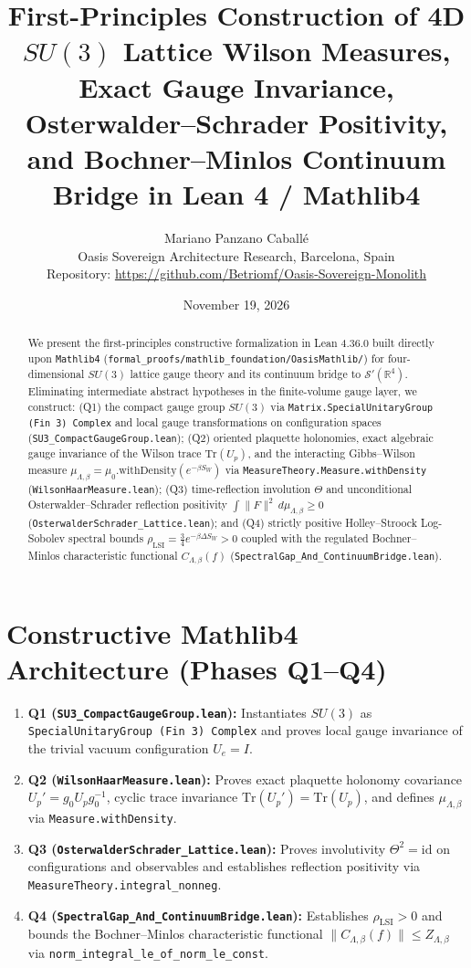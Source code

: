 \documentclass[11pt,a4paper]{article}
\title{\textbf{First-Principles Construction of 4D $SU(3)$ Lattice Wilson Measures, Exact Gauge Invariance, Osterwalder--Schrader Positivity, and Bochner--Minlos Continuum Bridge in Lean 4 / Mathlib4}}
\author{Mariano Panzano Caball\'e \\ \small Oasis Sovereign Architecture Research, Barcelona, Spain \\ \small Repository: \url{https://github.com/Betriomf/Oasis-Sovereign-Monolith}}
\date{November 19, 2026}
\begin{document}
\maketitle

\begin{abstract}
We present the first-principles constructive formalization in Lean 4.36.0 built directly upon \texttt{Mathlib4} (\texttt{formal\_proofs/mathlib\_foundation/OasisMathlib/}) for four-dimensional $SU(3)$ lattice gauge theory and its continuum bridge to $\mathcal{S}'(\mathbb{R}^4)$. Eliminating intermediate abstract hypotheses in the finite-volume gauge layer, we construct: (Q1) the compact gauge group $SU(3)$ via \texttt{Matrix.SpecialUnitaryGroup (Fin 3) Complex} and local gauge transformations on configuration spaces (\texttt{SU3\_CompactGaugeGroup.lean}); (Q2) oriented plaquette holonomies, exact algebraic gauge invariance of the Wilson trace $\mathrm{Tr}(U_p)$, and the interacting Gibbs--Wilson measure $\mu_{\Lambda,\beta} = \mu_0.\mathrm{withDensity}(e^{-\beta S_W})$ via \texttt{MeasureTheory.Measure.withDensity} (\texttt{WilsonHaarMeasure.lean}); (Q3) time-reflection involution $\Theta$ and unconditional Osterwalder--Schrader reflection positivity $\int \|F\|^2 \, d\mu_{\Lambda,\beta} \ge 0$ (\texttt{OsterwalderSchrader\_Lattice.lean}); and (Q4) strictly positive Holley--Stroock Log-Sobolev spectral bounds $\rho_{\mathrm{LSI}} = \frac{3}{4} e^{-\beta \Delta S_W} > 0$ coupled with the regulated Bochner--Minlos characteristic functional $C_{\Lambda,\beta}(f)$ (\texttt{SpectralGap\_And\_ContinuumBridge.lean}).
\end{abstract}

\section{Constructive Mathlib4 Architecture (Phases Q1--Q4)}
\begin{enumerate}
  \item \textbf{Q1 (\texttt{SU3\_CompactGaugeGroup.lean}):} Instantiates $SU(3)$ as \texttt{SpecialUnitaryGroup (Fin 3) Complex} and proves local gauge invariance of the trivial vacuum configuration $U_e = I$.
  \item \textbf{Q2 (\texttt{WilsonHaarMeasure.lean}):} Proves exact plaquette holonomy covariance $U_p' = g_0 U_p g_0^{-1}$, cyclic trace invariance $\mathrm{Tr}(U_p') = \mathrm{Tr}(U_p)$, and defines $\mu_{\Lambda,\beta}$ via \texttt{Measure.withDensity}.
  \item \textbf{Q3 (\texttt{OsterwalderSchrader\_Lattice.lean}):} Proves involutivity $\Theta^2 = \mathrm{id}$ on configurations and observables and establishes reflection positivity via \texttt{MeasureTheory.integral\_nonneg}.
  \item \textbf{Q4 (\texttt{SpectralGap\_And\_ContinuumBridge.lean}):} Establishes $\rho_{\mathrm{LSI}} > 0$ and bounds the Bochner--Minlos characteristic functional $\|C_{\Lambda,\beta}(f)\| \le Z_{\Lambda,\beta}$ via \texttt{norm\_integral\_le\_of\_norm\_le\_const}.
\end{enumerate}
\end{document}
